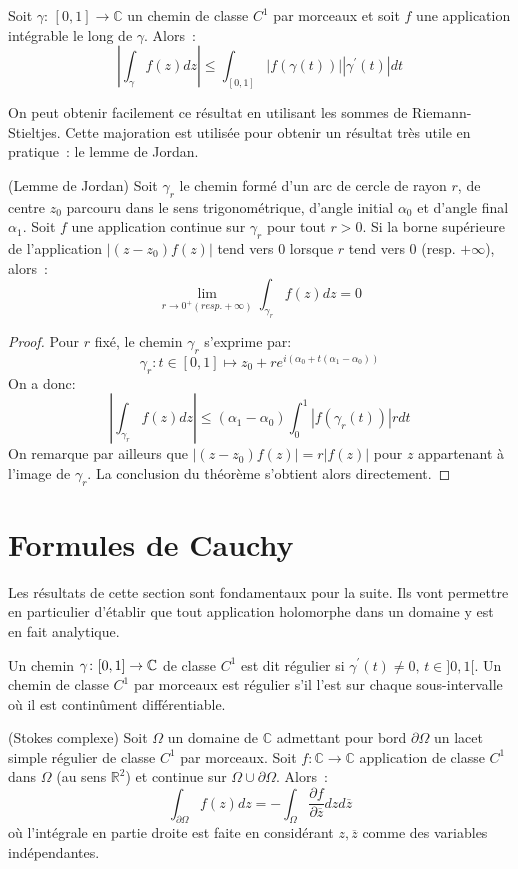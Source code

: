 \begin{fprop}
Soit $\gamma : \, [0,1] \to \mathbb{C}$ un chemin de classe $C^1$ par morceaux et soit
$f$ une application  intégrable le long de $\gamma$. Alors~:
\[
\left|\int_{\gamma} f(z) dz\right | \leq \int_{[0,1]} \left |f(\gamma(t)) \right | \left |\gamma^\prime(t) \right | dt
\]
\end{fprop}
On peut obtenir facilement ce résultat en utilisant les sommes de Riemann-Stieltjes.
Cette majoration est utilisée pour obtenir un résultat très utile en
pratique~: le lemme de Jordan.

\begin{fprop}(Lemme de Jordan)\label{prop:jordan}
Soit $\gamma_r$ le chemin formé d'un arc de cercle de rayon $r$, de centre $z_0$ parcouru
 dans le sens trigonométrique, d'angle initial $\alpha_0$ et d'angle final
 $\alpha_1$. Soit $f$ une application continue sur $\gamma_r$ pour
 tout $r>0$. Si la borne supérieure de l'application $|(z-z_0)f(z)|$ tend vers 0 lorsque $r$ 
 tend vers $0$ (resp. $+\infty$), alors~:
\[
\lim_{r \to 0^+ (resp. +\infty)} \int_{\gamma_r} f(z) dz = 0
\]
\end{fprop}
\begin{proof}
Pour $r$ fixé, le chemin $\gamma_r$ s'exprime par:
\[
\gamma_r \colon t \in [0,1] \mapsto z_0 + r e^{i \left(\alpha_0 +
t (\alpha_1 - \alpha_0)\right)}
\]
On a donc:
\[
\left|\int_{\gamma_r} f(z) dz\right| \leq (\alpha_1-\alpha_0) \int_0^1
|f(\gamma_r(t))|r dt 
\]
On remarque par ailleurs que $|(z-z_0)f(z)|=r|f(z)|$ pour $z$ appartenant à
l'image de $\gamma_r$. La conclusion du théorème s'obtient alors directement.
\end{proof}
\section{Formules de Cauchy}
Les résultats de cette section sont fondamentaux pour la suite. Ils vont
permettre en particulier d'établir que tout application holomorphe dans un
domaine y est en fait analytique.
\begin{fdefn}
Un chemin $\gamma \colon [0,1] \to \mathbb{C}$ de classe $C^1$ est dit régulier si $\gamma^\prime(t) \neq 0, \, t \in ]0,1[$. Un chemin de classe $C^1$ par morceaux est régulier s'il l'est sur chaque sous-intervalle où il est continûment différentiable. 
\end{fdefn}
\begin{fthm}(Stokes complexe)\label{thm:stokes_complexe} Soit $\Omega$ un domaine de $\mathbb{C}$
admettant pour bord $\partial \Omega$ un lacet simple régulier de
classe $C^1$ par morceaux. Soit $f : \mathbb{C} \to \mathbb{C}$
application de classe $C^1$ dans $\Omega$ (au sens $\mathbb{R}^2$) et continue
sur $\Omega \cup \partial \Omega$. Alors~:
\[
\int_{\partial \Omega} f(z) dz = - \int_{\Omega} \frac{\partial
f}{\partial \overline{z}} dz d\overline{z}
\]
où l'intégrale en partie droite est faite en considérant $z,\overline{z}$ comme des variables indépendantes.
\end{fthm}

